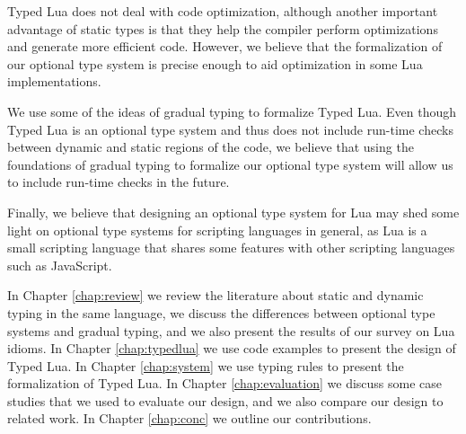 Typed Lua does not deal with code optimization, although another
important advantage of static types is that they help the compiler
perform optimizations and generate more efficient code.
However, we believe that the formalization of our optional type
system is precise enough to aid optimization in some Lua implementations.

We use some of the ideas of gradual typing to formalize Typed Lua.
Even though Typed Lua is an optional type system and thus does not
include run-time checks between dynamic and static regions of the
code, we believe that using the foundations of gradual typing to
formalize our optional type system will allow us to include run-time
checks in the future.

Finally, we believe that designing an optional type system for Lua may
shed some light on optional type systems for scripting languages
in general, as Lua is a small scripting language that shares
some features with other scripting languages such as JavaScript.

In Chapter \ref{chap:review} we review the literature about static
and dynamic typing in the same language, we discuss the differences
between optional type systems and gradual typing, and we also
present the results of our survey on Lua idioms.
In Chapter \ref{chap:typedlua} we use code examples to present the
design of Typed Lua.
In Chapter \ref{chap:system} we use typing rules to present the
formalization of Typed Lua.
In Chapter \ref{chap:evaluation} we discuss some case studies that
we used to evaluate our design, and we also compare our design
to related work.
In Chapter \ref{chap:conc} we outline our contributions.

